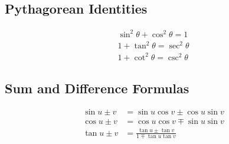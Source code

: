 \subsection{Pythagorean Identities}
\begin{align*}
  \sin^2\theta+\cos^2\theta=1 \\
  1+\tan^2\theta=\sec^2\theta \\
  1+\cot^2\theta=\csc^2\theta
\end{align*}

\subsection{Sum and Difference Formulas}
\begin{align*}
  \sin{u \pm v} &= \sin{u}\cos{v} \pm \cos{u}\sin{v} \\
  \cos{u \pm v} &= \cos{u}\cos{v} \mp \sin{u}\sin{v} \\
  \tan{u \pm v} &= \frac{\tan{u}\pm\tan{v}}{1\mp\tan{u}\tan{v}}
\end{align*}
